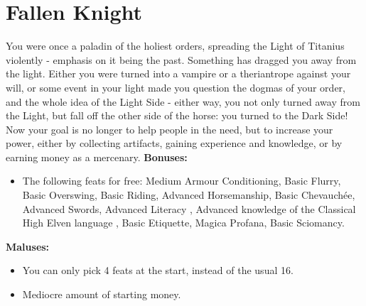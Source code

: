 \section{Fallen Knight}
You were once a paladin of the holiest orders, spreading the Light of Titanius violently - emphasis on it being the past. Something has dragged you away from the light. Either you were turned into a vampire or a theriantrope against your will, or some event in your light made you question the dogmas of your order, and the whole idea of the Light Side - either way, you not only turned away from the Light, but fall off the other side of the horse: you turned to the Dark Side! Now your goal is no longer to help people in the need, but to increase your power, either by collecting artifacts, gaining experience and knowledge, or by earning money as a mercenary.\newline
\textbf{Bonuses:}
\begin{itemize}
	\item The following feats for free: Medium Armour Conditioning, Basic Flurry, Basic Overswing, Basic Riding, Advanced Horsemanship, Basic Chevauchée, Advanced Swords, Advanced Literacy , Advanced knowledge of the Classical High Elven language , Basic Etiquette, Magica Profana, Basic Sciomancy.
\end{itemize}
\textbf{Maluses:}
\begin{itemize}
	\item You can only pick 4 feats at the start, instead of the usual 16.
	\item Mediocre amount of starting money.
\end{itemize}
